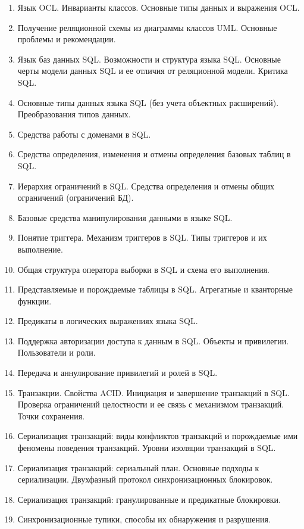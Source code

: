 \documentclass[a4paper,12pt]{article}
\begin{document}
\begin{titlepage}
\begin{multicols}{3}
\begin{enumerate}[label=\arabic*.]
            \item Язык OCL. Инварианты классов. Основные типы данных и выражения OCL.
            \item Получение реляционной схемы из диаграммы классов UML. Основные проблемы и рекомендации.
            \item Язык баз данных SQL. Возможности и структура языка SQL. Основные черты модели данных SQL и ее отличия от реляционной модели. Критика SQL.
            \item Основные типы данных языка SQL (без учета объектных расширений). Преобразования типов данных.
            \item Средства работы с доменами в SQL.
            \item Средства определения, изменения и отмены определения базовых таблиц в SQL.
            \item Иерархия ограничений в SQL. Средства определения и отмены общих ограничений (ограничений БД).
            \item Базовые средства манипулирования данными в языке SQL.
            \item Понятие триггера. Механизм триггеров в SQL. Типы триггеров и их выполнение.
            \item Общая структура оператора выборки в SQL и схема его выполнения.
            \item Представляемые и порождаемые таблицы в SQL. Агрегатные и кванторные функции.
            \item Предикаты в логических выражениях языка SQL.
            \item Поддержка авторизации доступа к данным в SQL. Объекты и привилегии. Пользователи и роли.
            \item Передача и аннулирование привилегий и ролей в SQL.
            \item Транзакции. Свойства ACID. Инициация и завершение транзакций в SQL. Проверка ограничений целостности и ее связь с механизмом транзакций. Точки сохранения.
            \item Сериализация транзакций: виды конфликтов транзакций и порождаемые ими феномены поведения транзакций. Уровни изоляции транзакций в SQL.
            \item Сериализация транзакций: сериальный план. Основные подходы к сериализации. Двухфазный протокол синхронизационных блокировок.
            \item Сериализация транзакций: гранулированные и предикатные блокировки.
            \item Синхронизационные тупики, способы их обнаружения и разрушения.

\end{enumerate}
\end{multicols}
\end{titlepage}
\end{document}
